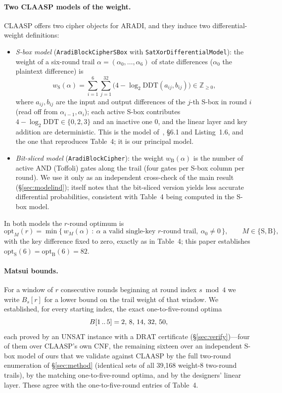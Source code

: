\documentclass[11pt]{article}
\begin{document}
\paragraph{Two CLAASP models of the weight.} CLAASP offers two cipher objects for ARADI, and they induce two differential-weight definitions:
\begin{itemize}
  \item \emph{S-box model} (\texttt{AradiBlockCipherSBox} with \texttt{SatXorDifferentialModel}): the weight of a six-round trail $\alpha=(\alpha_0,\dots,\alpha_6)$ of state differences ($\alpha_0$ the plaintext difference) is
\[
  w_{\mathrm S}(\alpha)=\sum_{i=1}^{6}\sum_{j=1}^{32}\bigl(4-\log_2\mathrm{DDT}(a_{ij},b_{ij})\bigr)\in\mathbb{Z}_{\ge 0},
\]
where $a_{ij},b_{ij}$ are the input and output differences of the $j$-th S-box in round $i$ (read off from $\alpha_{i-1},\alpha_i$); each active S-box contributes $4-\log_2\mathrm{DDT}\in\{0,2,3\}$ and an inactive one $0$, and the linear layer and key addition are deterministic. This is the model of~\cite{claasping}, \S6.1 and Listing~1.6, and the one that reproduces Table~4; it is our principal model.
  \item \emph{Bit-sliced model} (\texttt{AradiBlockCipher}): the weight $w_{\mathrm B}(\alpha)$ is the number of active AND (Toffoli) gates along the trail (four gates per S-box column per round). We use it only as an independent cross-check of the main result (\S\ref{sec:modelind}); \cite{claasping} itself notes that the bit-sliced version yields less accurate differential probabilities, consistent with Table~4 being computed in the S-box model.
\end{itemize}
In both models the $r$-round optimum is
\[
  \mathrm{opt}_M(r)=\min\bigl\{\,w_M(\alpha)\ :\ \alpha\text{ a valid single-key $r$-round trail},\ \alpha_0\neq 0\,\bigr\},\qquad M\in\{\mathrm S,\mathrm B\},
\]
with the key difference fixed to zero, exactly as in Table~4; this paper establishes $\mathrm{opt}_{\mathrm S}(6)=\mathrm{opt}_{\mathrm B}(6)=82$.

\paragraph{Matsui bounds.} For a window of $r$ consecutive rounds beginning at round index $s \bmod 4$ we write $B_s[r]$ for a lower bound on the trail weight of that window. We established, for every starting index, the exact one-to-five-round optima
\[
B[1\mathinner{..}5] = 2,\,8,\,14,\,32,\,50,
\]
each proved by an UNSAT instance with a DRAT certificate (\S\ref{sec:verify})---four of them over CLAASP's own CNF, the remaining sixteen over an independent S-box model of ours that we validate against CLAASP by the full two-round enumeration of \S\ref{sec:method} (identical sets of all 39{,}168 weight-8 two-round trails), by the matching one-to-five-round optima, and by the designers' linear layer. These agree with the one-to-five-round entries of Table~4.
\end{document}
